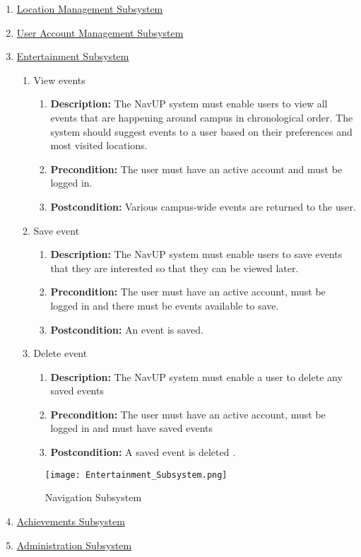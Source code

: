\documentclass{article}
\begin{document}
\begin{enumerate}
	
	\item \underline{Location Management Subsystem}
	\item \underline{User Account Management Subsystem}
	
	
	\item \underline{Entertainment Subsystem}
			\begin{enumerate}
		\item View events
		\begin{enumerate}
			\item \textbf{Description:} The NavUP system must enable users to view all events that are happening around campus in chronological order. The system should suggest events to a user based on their preferences and most visited locations.
			\item \textbf{Precondition:} The user must have an active account and must be logged in.
			\item \textbf{Postcondition:} Various campus-wide events are returned to the user.\newline
		\end{enumerate}
		
		\item Save event
		\begin{enumerate}
			\item \textbf{Description:} The NavUP system must enable users to save events that they are interested so that they can be viewed later.
			\item \textbf{Precondition:} The user must have an active account, must be logged in and there must be events available to save.
			\item \textbf{Postcondition:} An event is saved.\newline
		\end{enumerate}
		
		\item Delete event
		\begin{enumerate}
			\item \textbf{Description:} The NavUP system must enable a user to delete any saved events
			\item \textbf{Precondition:} The user must have an active account, must be logged in and must have saved events
			\item \textbf{Postcondition:} A saved event is deleted .\newline
		\end{enumerate}
	\end{enumerate}
	\begin{figure}[h!]
		\texttt{[image: Entertainment\_Subsystem.png]}
		\caption{Navigation Subsystem}	
	\end{figure}	
	
	\item \underline{Achievements Subsystem}
	\item \underline{Administration Subsystem}
	\end{enumerate}
	
\end{document}

